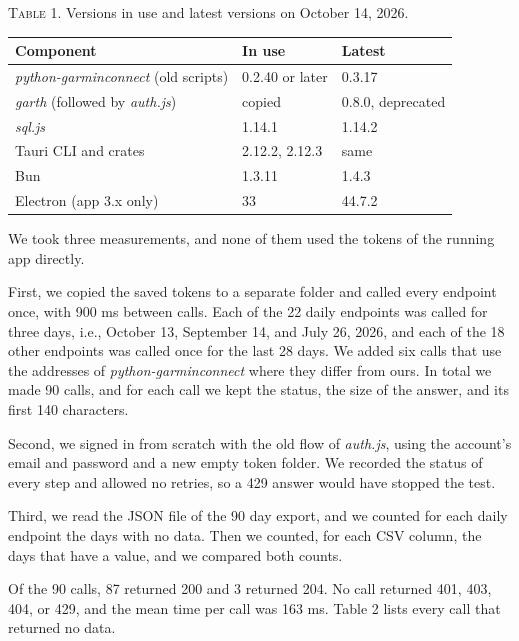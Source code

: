 \documentclass[11pt]{article}
\newcommand\code[1]{\textit{#1}}
\begin{document}
\begin{center}\footnotesize
\textsc{Table 1.} Versions in use and latest versions on October 14, 2026.\par\smallskip
\begin{tabular}{@{}lll@{}}
\toprule
Component & In use & Latest \\
\midrule
\code{python-garminconnect} (old scripts) & 0.2.40 or later & 0.3.17 \\
\code{garth} (followed by \code{auth.js}) & copied & 0.8.0, deprecated \\
\code{sql.js} & 1.14.1 & 1.14.2 \\
Tauri CLI and crates & 2.12.2, 2.12.3 & same \\
Bun & 1.3.11 & 1.4.3 \\
Electron (app 3.x only) & 33 & 44.7.2 \\
\bottomrule
\end{tabular}
\end{center}

 We took three measurements, and none of them used the tokens of the running app directly.

First, we copied the saved tokens to a separate folder and called every endpoint once, with 900 ms between calls. Each of the 22 daily endpoints was called for three days, i.e., October 13, September 14, and July 26, 2026, and each of the 18 other endpoints was called once for the last 28 days. We added six calls that use the addresses of \code{python-garminconnect} where they differ from ours. In total we made 90 calls, and for each call we kept the status, the size of the answer, and its first 140 characters.

Second, we signed in from scratch with the old flow of \code{auth.js}, using the account's email and password and a new empty token folder. We recorded the status of every step and allowed no retries, so a 429 answer would have stopped the test.

Third, we read the JSON file of the 90 day export, and we counted for each daily endpoint the days with no data. Then we counted, for each CSV column, the days that have a value, and we compared both counts.

 Of the 90 calls, 87 returned 200 and 3 returned 204. No call returned 401, 403, 404, or 429, and the mean time per call was 163 ms. Table 2 lists every call that returned no data.
\end{document}
